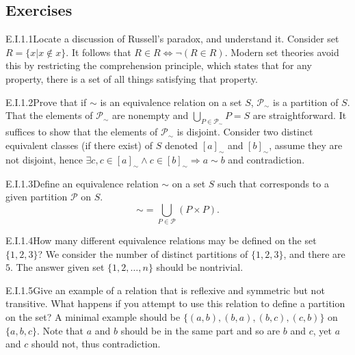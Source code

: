 \subsection*{Exercises}

\begin{exercise}{E.I.1.1}{Locate a discussion of Russell’s paradox, and understand it.}
  Consider set $R=\{x|x\notin x\}$. It follows that $R\in R \Leftrightarrow\neg(R\in R)$. Modern set theories avoid this by restricting the comprehension principle, which states that for any property, there is a set of all things satisfying that property.
\end{exercise}

\begin{exercise}{E.I.1.2}{Prove that if $\sim$ is an equivalence relation on a set $S$, $\mathcal{P}_{\sim}$ is a partition of $S$.}
  That the elements of $\mathcal{P}_{\sim}$ are nonempty and $\bigcup_{P\in \mathcal{P}_{\sim}}P=S$ are straightforward. It suffices to show that the elements of $\mathcal{P}_{\sim}$ is disjoint. Consider two distinct equivalent classes (if there exist) of $S$ denoted $[a]_{\sim}$ and $[b]_{\sim}$, assume they are not disjoint, hence $\exists c, c\in[a]_{\sim}\wedge c\in[b]_{\sim}\Rightarrow a\sim b$ and contradiction.
\end{exercise}

\begin{exercise}{E.I.1.3}{Define an equivalence relation $\sim$ on a set $S$ such that corresponds to a given partition $\mathcal{P}$ on $S$.}
  \[
    \sim=\bigcup_{P\in \mathcal{P}}(P\times P).
  \]
\end{exercise}

\begin{exercise}{E.I.1.4}{How many diﬀerent equivalence relations may be defined on the set $\{1,2,3\}$?}
  We consider the number of distinct partitions of $\{1,2,3\}$, and there are $5$. The answer given set $\{1,2,\dots,n\}$ should be nontrivial.
\end{exercise}

\begin{exercise}{E.I.1.5}{Give an example of a relation that is reflexive and symmetric but not transitive. What happens if you attempt to use this relation to define a partition on the set?}
  A minimal example should be $\{(a,b),(b,a),(b,c),(c,b)\}$ on $\{a,b,c\}$. Note that $a$ and $b$ should be in the same part and so are $b$ and $c$, yet $a$ and $c$ should not, thus contradiction.
\end{exercise}

